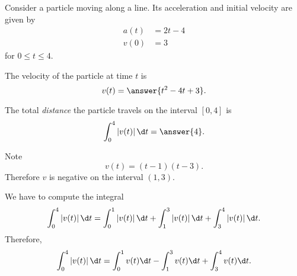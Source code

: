 \documentclass{ximera}
\author{Nela Lakos \and Kyle Parsons}
\begin{document}
\begin{exercise}

Consider a particle moving along a line.  Its acceleration and initial velocity are given by
\begin{align*}
a(t) &= 2t-4\\
v(0) &= 3
\end{align*}
for $0\leq t\leq4$.

The velocity of the particle at time $t$ is
\[
v(t) = \answer{t^2-4t+3}.
\]

The total \emph{distance} the particle travels on the interval $[0,4]$ is
\[
\int_0^4 \left|v(t)\right| \d t = \answer{4}.
\]
\begin{hint}
Note
\[
v(t)=(t-1)(t-3).
\]
Therefore $v$ is negative on the interval $(1,3)$.

\end{hint}
\begin{hint}
We have to compute the integral
\[
\int_0^4 \left|v(t)\right| \d t =\int_0^1 \left|v(t)\right| \d t+\int_1^3 \left|v(t)\right| \d t+\int_3^4 \left|v(t)\right| \d t.
\]
Therefore,
\[
\int_0^4 \left|v(t)\right| \d t =\int_0^1 v(t) \d t-\int_1^3v(t)\d t+\int_3^4 v(t) \d t.
\]

\end{hint}
\end{exercise}
\end{document}
